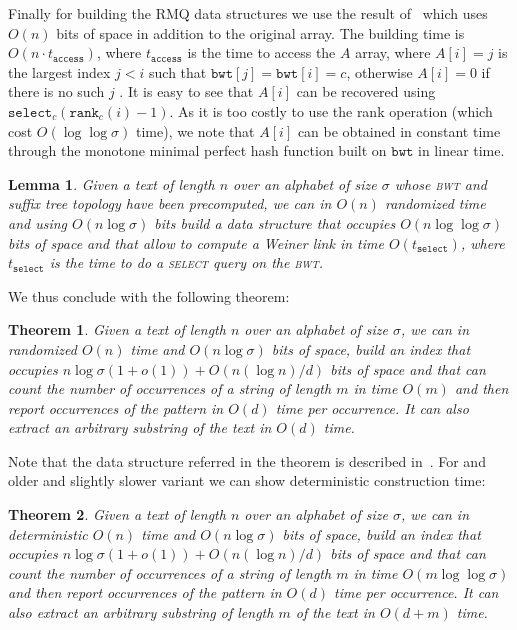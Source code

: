 \documentclass[a4paper]{article}
\newtheorem{lemma}{Lemma}
\newtheorem{theorem}{Theorem}
\begin{document}
Finally for building the RMQ data structures we use the 
result of~\cite{Fi10} which uses $O(n)$ bits of space 
in addition to the original array. The building time 
is $O(n\cdot t_{\mathtt{access}})$, where $t_{\mathtt{access}}$ is the time 
to access the $A$ array, where $A[i]=j$ is the largest index $j<i$
such that $\mathtt{bwt}[j]=\mathtt{bwt}[i]=c$, otherwise $A[i]=0$ 
if there is no such $j$ . It is easy to see that $A[i]$ 
can be recovered using $\mathtt{select}_{c}(\mathtt{rank}_{c}(i)-1)$. 
As it is too costly to use the rank operation (which cost $O(\log\log\sigma)$ 
time), we note that $A[i]$ can be obtained in constant time through the monotone 
minimal perfect hash function built on $\mathtt{bwt}$ in linear time. 

\begin{lemma}
\label{lemma:weiner_link_support}
Given a text of length $n$ over an alphabet of size $\sigma$ 
whose \textsc{bwt} and suffix tree topology 
have been precomputed, we can in $O(n)$ randomized time and using $O(n\log\sigma)$
bits build a data structure that occupies $O(n\log\log\sigma)$ bits of space
and that allow to compute a Weiner link in time $O(t_{\mathtt{select}})$, 
where $t_{\mathtt{select}}$ is the time to do a \textsc{select} query on the \textsc{bwt}. 
\end{lemma}
We thus conclude with the following theorem:
\begin{theorem}
Given a text of length $n$ over an alphabet of size $\sigma$, 
we can in randomized $O(n)$ time and $O(n\log\sigma)$ bits 
of space, build an index that occupies $n\log\sigma(1+o(1))+O(n(\log n)/d)$ 
bits of space and that can count the number of occurrences 
of a string of length $m$ in time $O(m)$ and then report occurrences of 
the pattern  in $O(d)$ time per occurrence. It can also extract an arbitrary
substring of the text in $O(d)$ time. 
\end{theorem}

Note that the data structure referred in the theorem is described in~\cite{BNtalg14}. 
For and older and slightly slower variant we can show deterministic 
construction time:
\begin{theorem}
Given a text of length $n$ over an alphabet of size $\sigma$, 
we can in deterministic $O(n)$ time and $O(n\log\sigma)$ bits 
of space, build an index that occupies 
$n\log\sigma(1+o(1))+O(n(\log n)/d)$ bits of space and that can count the number of occurrences 
of a string of length $m$ in time $O(m\log\log\sigma)$ and then report occurrences of 
the pattern  in $O(d)$ time per occurrence. It can also extract an arbitrary
substring of length $m$ of the text in $O(d+m)$ time. 
\end{theorem}
\end{document}
